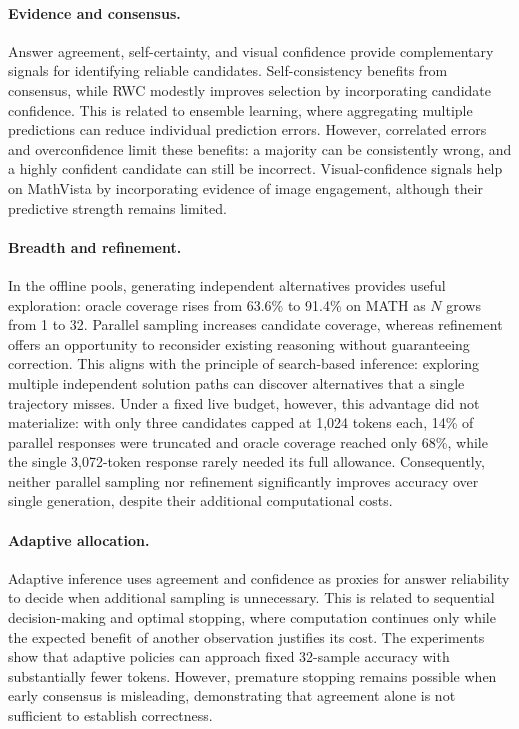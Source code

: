 \documentclass{article}
\begin{document}
\paragraph{Evidence and consensus.}
Answer agreement, self-certainty, and visual confidence provide complementary signals for identifying reliable candidates. Self-consistency benefits from consensus, while RWC modestly improves selection by incorporating candidate confidence. This is related to ensemble learning, where aggregating multiple predictions can reduce individual prediction errors. However, correlated errors and overconfidence limit these benefits: a majority can be consistently wrong, and a highly confident candidate can still be incorrect. Visual-confidence signals help on MathVista by incorporating evidence of image engagement, although their predictive strength remains limited.

\paragraph{Breadth and refinement.}
In the offline pools, generating independent alternatives provides useful exploration: oracle coverage rises from 63.6\% to 91.4\% on MATH as $N$ grows from 1 to 32. Parallel sampling increases candidate coverage, whereas refinement offers an opportunity to reconsider existing reasoning without guaranteeing correction. This aligns with the principle of search-based inference: exploring multiple independent solution paths can discover alternatives that a single trajectory misses. Under a fixed live budget, however, this advantage did not materialize: with only three candidates capped at 1,024 tokens each, 14\% of parallel responses were truncated and oracle coverage reached only 68\%, while the single 3,072-token response rarely needed its full allowance. Consequently, neither parallel sampling nor refinement significantly improves accuracy over single generation, despite their additional computational costs.

\paragraph{Adaptive allocation.}
Adaptive inference uses agreement and confidence as proxies for answer reliability to decide when additional sampling is unnecessary. This is related to sequential decision-making and optimal stopping, where computation continues only while the expected benefit of another observation justifies its cost. The experiments show that adaptive policies can approach fixed 32-sample accuracy with substantially fewer tokens. However, premature stopping remains possible when early consensus is misleading, demonstrating that agreement alone is not sufficient to establish correctness.
\end{document}
